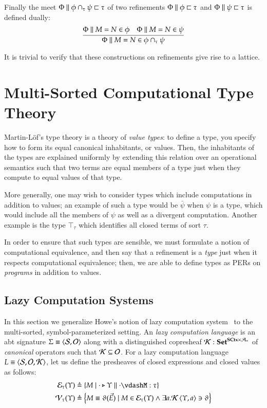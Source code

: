 \documentclass[11pt]{article}
\theoremstyle{definition}
\theoremstyle{remark}
\numberwithin{equation}{section}
\def\IModeColorName{MidnightBlue}
\def\OModeColorName{Maroon}
\def\IModeColorName{Black}
\def\OModeColorName{Black}
\newcommand\IMode[1]{{\color{\IModeColorName}{#1}}}
\newcommand\OMode[1]{{\color{\OModeColorName}{#1}}}
\newcommand\MkSet[1]{\left\{#1\right\}}
\newcommand\Of[2]{\IMode{#1}: \IMode{#2}}
\newcommand\Match[2]{\IMode{#1}\equiv\OMode{#2}}
\newcommand\Sorts{\mathcal{S}}
\newcommand\Arities{\mathcal{A}}
\newcommand\Operators{\mathcal{O}}
\newcommand\CanOperators{\mathcal{K}}
\newcommand\Discrete[1]{#1_{\equiv}}
\newcommand\Sets{\mathbf{Set}}
\newcommand\SCtx{\mathbf{SCtx}}
\newcommand\Pair[2]{\left\langle#1, #2 \right\rangle}
\newcommand\Tuple[1]{\left\langle#1 \right\rangle}
\newcommand\IsAbtUnmoded[5]{
  #1\triangleright%
  #2\parallel%
  #3\vdash%
  #4:\OMode{#5}%
}
\newcommand\App[2]{#1(#2)}
\newcommand\IsSubsetEq[2]{\IMode{#1}\subseteq\IMode{#2}}
\newcommand\ADefine[2]{\IMode{#1}&\triangleq\OMode{#2}}
\newcommand\Refines[3]{\IMode{#1}\parallel\IMode{#2}\sqsubset\OMode{#3}}
\newcommand\RMemEq[4]{\IMode{#1}\parallel\IMode{#2}=\IMode{#3}\in\IMode{#4}}
\newcommand\TyTop[1]{\top_{#1}}
\newcommand\TyMeet[1]{\cap_{#1}}
\newcommand\Exprs{\mathcal{E}}
\newcommand\Values{\mathcal{V}}
\begin{document}
Finally the meet $\Refines{\Phi}{\phi\TyMeet{\tau}\psi}{\tau}$ of two refinements
$\Refines{\Phi}{\phi}{\tau}$ and $\Refines{\Phi}{\psi}{\tau}$ is defined
dually:
\[
  \infer{
    \RMemEq{\Phi}{M}{N}{\phi\TyMeet{\tau}\psi}
  }{
    \RMemEq{\Phi}{M}{N}{\phi} &
    \RMemEq{\Phi}{M}{N}{\psi}
  }
\]

It is trivial to verify that these constructions on refinements give rise to a
lattice.

\section{Multi-Sorted Computational Type Theory}

Martin-L\"of's type theory is a theory of \emph{value types}: to define a type,
you specify how to form its equal canonical inhabitants, or values. Then, the
inhabitants of the types are explained uniformly by extending this relation
over an operational semantics such that two terms are equal members of a
type just when they compute to equal values of that type.

More generally, one may wish to consider types which include computations in
addition to values; an example of such a type would be $\bar{\psi}$ when $\psi$
is a type, which would include all the members of $\psi$ as well as a divergent
computation. Another example is the type $\TyTop{\tau}$ which identifies all
closed terms of sort $\tau$.

In order to ensure that such types are sensible, we must formulate a notion of
computational equivalence, and then say that a refinement is a \emph{type} just
when it respects computational equivalence; then, we are able to define types
as PERs on \emph{programs} in addition to values.


\subsection{Lazy Computation Systems}

In this section we generalize Howe's notion of lazy computation
system~\cite{howe:1989} to the multi-sorted, symbol-parameterized setting. An
\emph{lazy computation language} is an abt signature
$\Match{\Sigma}{\Pair{\Sorts}{\Operators}}$ along with a distinguished copresheaf
$\Of{\CanOperators}{\Sets^{\SCtx\times\Discrete{\Arities}}}$ of
\emph{canonical} operators such that $\IsSubsetEq{\CanOperators}{\Operators}$.
For a lazy computation language
$\Match{L}{\Tuple{\Sorts,\Operators,\CanOperators}}$, let us define the
presheaves of closed expressions and closed values as follows:
\begin{align*}
  \ADefine{\Exprs_\tau(\Upsilon)}{
    \MkSet{M \mid \IsAbtUnmoded{\cdot}{\Upsilon}{\cdot}{M}{\tau}}
  }\\
  \ADefine{\Values_\tau(\Upsilon)}{
    \MkSet{
      M\equiv\App{\vartheta}{\vec{E}}
      \mid M\in\Exprs_\tau(\Upsilon)\land \exists a. \CanOperators\Pair{\Upsilon}{a}\ni\vartheta
    }
  }
\end{align*}
\end{document}
